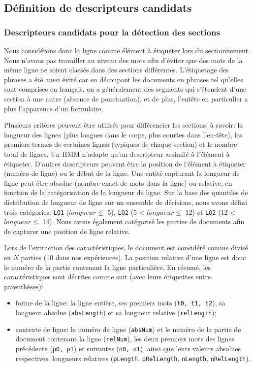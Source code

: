\subsection{Définition de descripteurs candidats}

\subsubsection{Descripteurs candidats pour la détection des sections}

Nous considérons donc la ligne comme élément à étiqueter lors du sectionnement. Nous n'avons pas travailler au niveau des mots afin d'éviter que des mots de la même ligne ne soient classés dans des sections différentes. L'étiquetage des phrases a été aussi évité car en découpant les documents en phrases tel qu'elles sont comprises en français, on a généralement des segments qui s'étendent d'une section à une autre (absence de ponctuation), et de plus, l'entête en particulier a plus l'apparence d'un formulaire.

Plusieurs critères peuvent être utilisés pour différencier les sections, à savoir: la longueur des lignes (plus longues dans le corps, plus courtes dans l'en-tête), les premiers termes de certaines lignes (typiques de chaque section) et le nombre total de lignes. Un HMM n'adapte qu'un descripteur assimilé à l'élément à étiqueter. D'autres descripteurs peuvent être la position de l'élément à étiqueter (numéro de ligne) ou le début de la ligne. Une entité capturant la longueur de ligne peut être absolue (nombre exact de mots dans la ligne) ou relative, en fonction de la catégorisation de la longueur de ligne. Sur la base des quantiles de distribution de longueur de ligne sur un ensemble de décisions, nous avons défini trois catégories:
\verb|LQ1| ($longueur \leq$ 5), \verb|LQ2| (5 < $longueur \leq$ 12) et \verb|LQ2| (12 < $longueur \leq$ 14). Nous avons également catégorisé les parties de documents afin de capturer une position de ligne relative.

Lors de l'extraction des caractéristiques, le document est considéré comme divisé en $N$ parties (10 dans nos expériences). La position relative d'une ligne est donc le numéro de la partie contenant la ligne particulière. En résumé, les caractéristiques sont décrites comme suit (avec leurs étiquettes entre parenthèses):
\begin{itemize}
 \item forme de la ligne: la ligne entière, ses premiers mots (\verb|t0, t1, t2|), sa longueur absolue (\verb|absLength|) et sa longueur relative (\verb|relLength|);
 \item contexte de ligne: le numéro de ligne (\verb|absNum|) et le numéro de la partie de document contenant la ligne (\verb|relNum|), les deux premiers mots des lignes précédente (\verb|p0, p1|) et suivantes (\verb|n0, n1|), ainsi que leurs valeurs absolues respectives. longueurs relatives
 (\verb|pLength|, \verb|pRelLength|, \verb|nLength|, \verb|nRelLength|).
\end{itemize}

